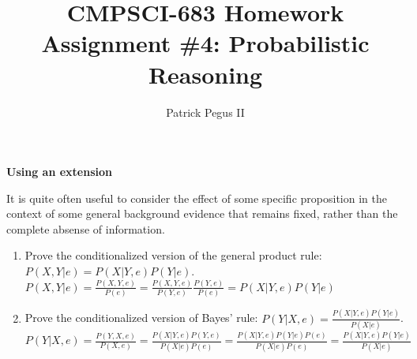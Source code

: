 \documentclass[12pt]{article}
\newenvironment{problem}[2][Problem]{\begin{trivlist}
\item[\hskip \labelsep {\bfseries #1}\hskip \labelsep {\bfseries #2.}]}{\end{trivlist}}
\begin{document}

\title{CMPSCI-683 Homework Assignment \#4: Probabilistic Reasoning}
\author{Patrick Pegus II}
\maketitle

\textbf{Using an extension}

\begin{problem}{1}
	 It is quite often useful to consider the effect of some specific proposition in the context of
	 some general background evidence that remains fixed, rather than the complete absense of information.
	 \begin{enumerate}
		 \item Prove the conditionalized version of the general product rule: $P(X,Y|e) = P(X|Y,e)P(Y|e)$.\\
			 $P(X,Y|e)=\frac{P(X,Y,e)}{P(e)}=\frac{P(X,Y,e)}{P(Y,e)}\frac{P(Y,e)}{P(e)}=P(X|Y,e)P(Y|e)$
		 \item Prove the conditionalized version of Bayes' rule: $P(Y|X,e) = \frac{P(X|Y,e) P(Y|e)}{P(X|e)}$.\\
			 $P(Y|X,e)=\frac{P(Y,X,e)}{P(X,e)}=\frac{P(X|Y,e)P(Y,e)}{P(X|e)P(e)}=
			 \frac{P(X|Y,e)P(Y|e)P(e)}{P(X|e)P(e)}=\frac{P(X|Y,e) P(Y|e)}{P(X|e)}$
	 \end{enumerate}
\end{problem}
\end{document}
